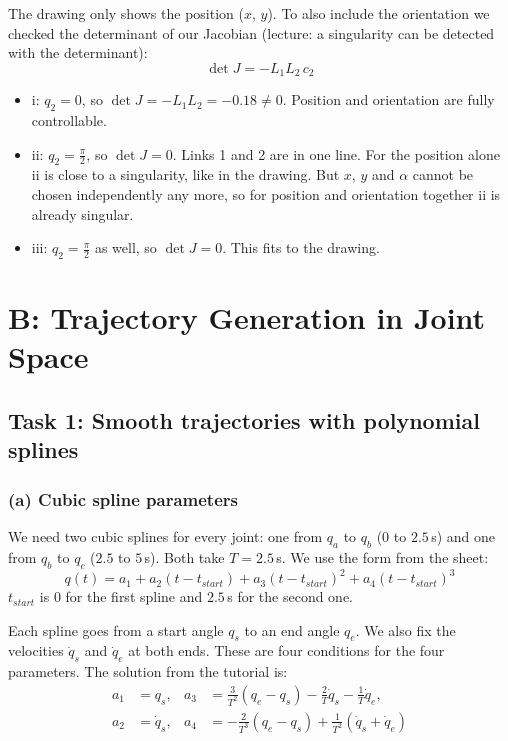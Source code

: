 \documentclass[11pt, a4paper]{article}
\begin{document}
The drawing only shows the position ($x$, $y$). To also include the orientation we checked the
determinant of our Jacobian (lecture: a singularity can be detected with the determinant):
\[
  \det J = -L_1 L_2\, c_2
\]
\begin{itemize}
  \item i: $q_2 = 0$, so $\det J = -L_1 L_2 = -0.18 \neq 0$. Position and orientation are fully
        controllable.
  \item ii: $q_2 = \frac{\pi}{2}$, so $\det J = 0$. Links 1 and 2 are in one line. For the position
        alone ii is close to a singularity, like in the drawing. But $x$, $y$ and $\alpha$ cannot be
        chosen independently any more, so for position and orientation together ii is already
        singular.
  \item iii: $q_2 = \frac{\pi}{2}$ as well, so $\det J = 0$. This fits to the drawing.
\end{itemize}

\section*{B: Trajectory Generation in Joint Space}

\subsection*{Task 1: Smooth trajectories with polynomial splines}

\subsubsection*{(a) Cubic spline parameters}

We need two cubic splines for every joint: one from $q_a$ to $q_b$ ($0$ to $2.5$\,s) and one from
$q_b$ to $q_c$ ($2.5$ to $5$\,s). Both take $T = 2.5$\,s. We use the form from the sheet:
\[
  q(t) = a_1 + a_2 (t - t_{start}) + a_3 (t - t_{start})^2 + a_4 (t - t_{start})^3
\]
$t_{start}$ is $0$ for the first spline and $2.5$\,s for the second one.

Each spline goes from a start angle $q_s$ to an end angle $q_e$. We also fix the velocities
$\dot q_s$ and $\dot q_e$ at both ends. These are four conditions for the four parameters. The
solution from the tutorial is:
\begin{align*}
  a_1 &= q_s, &
  a_3 &= \frac{3}{T^2}(q_e - q_s) - \frac{2}{T}\dot q_s - \frac{1}{T}\dot q_e, \\
  a_2 &= \dot q_s, &
  a_4 &= -\frac{2}{T^3}(q_e - q_s) + \frac{1}{T^2}(\dot q_s + \dot q_e)
\end{align*}
\end{document}
